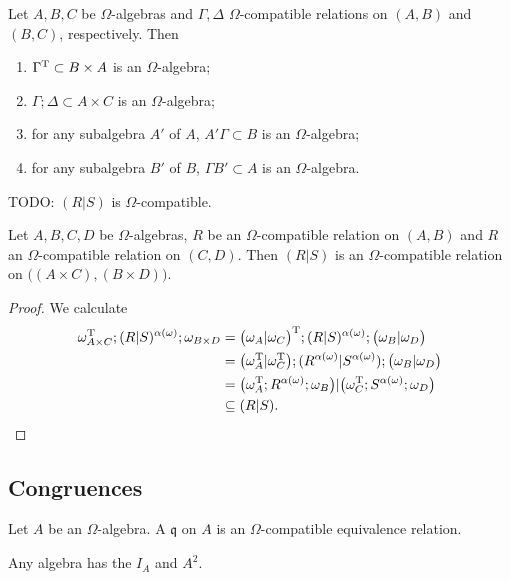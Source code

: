 \begin{lemma}
Let $A,B,C$ be $\Omega$-algebras and $\Gamma, \Delta$ $\Omega$-compatible relations on $(A, B)$ and $(B, C)$, respectively. Then
\begin{enumerate}
\item $\Gamma^{\mathrm{T}} \subset B\times A$ is an $\Omega$-algebra;
\item $\Gamma;\Delta \subset A\times C$ is an $\Omega$-algebra;
\item for any subalgebra $A'$ of $A$, $A'\Gamma \subset B$ is an $\Omega$-algebra;
\item for any subalgebra $B'$ of $B$, $\Gamma B' \subset A$ is an $\Omega$-algebra.
\end{enumerate}
\end{lemma}

TODO: $(R|S)$ is $\Omega$-compatible.
\begin{lemma}
Let $A,B,C,D$ be $\Omega$-algebras, $R$ be an $\Omega$-compatible relation on $(A,B)$ and $R$ an $\Omega$-compatible relation on $(C,D)$. Then $(R|S)$ is an $\Omega$-compatible relation on $\big((A\times C), (B\times D)\big)$.
\end{lemma}
\begin{proof}
We calculate
\begin{align*}
\omega_{A\times C}^{\mathrm{T}};(R|S)^{\alpha(\omega)};\omega_{B\times D} &= \big(\omega_A|\omega_C\big)^{\mathrm{T}};(R|S)^{\alpha(\omega)};\big(\omega_B|\omega_D\big) \\
&= \big(\omega_A^{\mathrm{T}}|\omega_C^{\mathrm{T}}\big);(R^{\alpha(\omega)}|S^{\alpha(\omega)});\big(\omega_B|\omega_D\big) \\
&= \big(\omega_A^{\mathrm{T}};R^{\alpha(\omega)};\omega_B\big)|\big(\omega_C^{\mathrm{T}};S^{\alpha(\omega)};\omega_D\big) \\
&\subseteq (R|S).
\end{align*}
\end{proof}

\subsection{Congruences}
\begin{definition}
Let $A$ be an $\Omega$-algebra. A  $\mathfrak{q}$ on $A$ is an $\Omega$-compatible equivalence relation.
\end{definition}

\begin{example}
Any algebra has the  $I_A$ and $A^2$.
\end{example}


